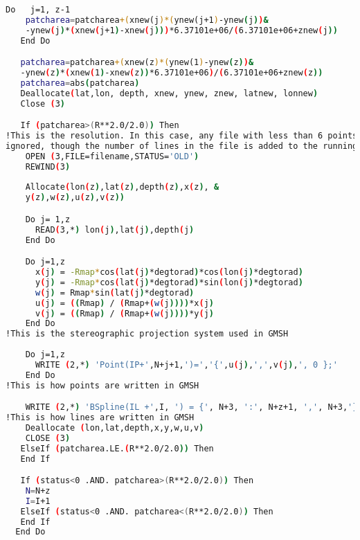 \begin{lstlisting}[language = Bash]
   Do   j=1, z-1
    patcharea=patcharea+(xnew(j)*(ynew(j+1)-ynew(j))&
    -ynew(j)*(xnew(j+1)-xnew(j)))*6.37101e+06/(6.37101e+06+znew(j))
   End Do

   patcharea=patcharea+(xnew(z)*(ynew(1)-ynew(z))&
   -ynew(z)*(xnew(1)-xnew(z))*6.37101e+06)/(6.37101e+06+znew(z))
   patcharea=abs(patcharea)
   Deallocate(lat,lon, depth, xnew, ynew, znew, latnew, lonnew)
   Close (3)

   If (patcharea>(R**2.0/2.0)) Then
!This is the resolution. In this case, any file with less than 6 points is 
ignored, though the number of lines in the file is added to the running total
    OPEN (3,FILE=filename,STATUS='OLD')
    REWIND(3)
    
    Allocate(lon(z),lat(z),depth(z),x(z), &
    y(z),w(z),u(z),v(z))

    Do j= 1,z
      READ(3,*) lon(j),lat(j),depth(j)
    End Do

    Do j=1,z 
      x(j) = -Rmap*cos(lat(j)*degtorad)*cos(lon(j)*degtorad)
      y(j) = -Rmap*cos(lat(j)*degtorad)*sin(lon(j)*degtorad)
      w(j) = Rmap*sin(lat(j)*degtorad)
      u(j) = ((Rmap) / (Rmap+(w(j))))*x(j)
      v(j) = ((Rmap) / (Rmap+(w(j))))*y(j)
    End Do
!This is the stereographic projection system used in GMSH
  
    Do j=1,z
      WRITE (2,*) 'Point(IP+',N+j+1,')=','{',u(j),',',v(j),', 0 };'
    End Do
!This is how points are written in GMSH

    WRITE (2,*) 'BSpline(IL +',I, ') = {', N+3, ':', N+z+1, ',', N+3,'};'
!This is how lines are written in GMSH
    Deallocate (lon,lat,depth,x,y,w,u,v)
    CLOSE (3)  
   ElseIf (patcharea.LE.(R**2.0/2.0)) Then
   End If

   If (status<0 .AND. patcharea>(R**2.0/2.0)) Then
    N=N+z
    I=I+1
   ElseIf (status<0 .AND. patcharea<(R**2.0/2.0)) Then
   End If
  End Do
 

\end{lstlisting}
